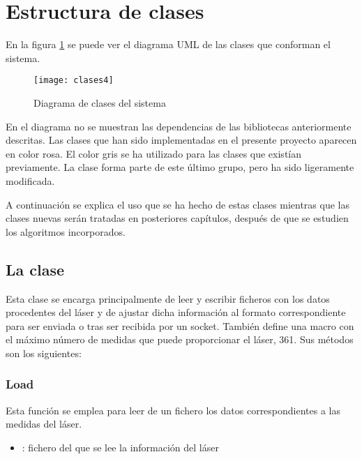 \section{ Estructura de clases}
En la figura \ref{fg:uml} se puede ver el diagrama UML de las clases que conforman el sistema.

\begin{figure}[h]
  \centering\texttt{[image: clases4]}\\
  \caption{Diagrama de clases del sistema}\label{fg:uml}
\end{figure}

En el diagrama no se muestran las dependencias de las bibliotecas anteriormente descritas. Las clases que han sido implementadas en el presente proyecto aparecen en color rosa. El color gris se ha utilizado para las clases que existían previamente. La clase  forma parte de este último grupo, pero ha sido ligeramente modificada.

A continuación se explica el uso que se ha hecho de estas clases mientras que las clases nuevas serán tratadas en posteriores capítulos, después de que se estudien los algoritmos incorporados.

\clearpage

\subsection{La clase }
Esta clase se encarga principalmente de leer y escribir ficheros con los datos procedentes del láser y de ajustar dicha información al formato correspondiente para ser enviada o tras ser recibida por un socket. También define una macro con el máximo número de medidas que puede proporcionar el láser, 361.
Sus métodos son los siguientes:

\subsubsection{Load}

\noindent
{}

\noindent
Esta función se emplea para leer de un fichero los datos correspondientes a las medidas del láser.

\begin{itemize}
  \item {}: fichero del que se lee la información del láser
\end{itemize}

